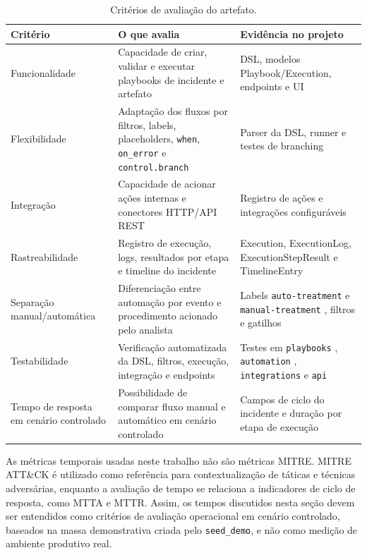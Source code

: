 \documentclass[article,a4paper,12pt,english,brazil,sumario=tradicional]{abntex2}
\newcommand{\codecell}[1]{%
  \begingroup
  \def\UrlLeft{}\def\UrlRight{}%
  \nolinkurl{#1}%
  \endgroup
}
\begin{document}
\begin{table}[!ht]
\centering
\footnotesize
\renewcommand{\arraystretch}{1.2}
\setlength{\extrarowheight}{1pt}
\setlength{\tabcolsep}{4pt}
\caption{Critérios de avaliação do artefato.}
\label{tab:criterios}
\begin{tabularx}{\textwidth}{@{}L{2.8cm} Y L{4.1cm}@{}}
\toprule
\textbf{Critério} & \textbf{O que avalia} & \textbf{Evidência no projeto} \\
\midrule
Funcionalidade & Capacidade de criar, validar e executar playbooks de incidente e artefato & DSL, modelos Playbook/Execution, endpoints e UI \\
Flexibilidade & Adaptação dos fluxos por filtros, labels, placeholders, \texttt{when}, \texttt{on\_error} e \texttt{control.branch} & Parser da DSL, runner e testes de branching \\
Integração & Capacidade de acionar ações internas e conectores HTTP/API REST & Registro de ações e integrações configuráveis \\
Rastreabilidade & Registro de execução, logs, resultados por etapa e timeline do incidente & Execution, ExecutionLog, ExecutionStepResult e TimelineEntry \\
Separação manual/automática & Diferenciação entre automação por evento e procedimento acionado pelo analista & Labels \codecell{auto-treatment} e \codecell{manual-treatment}, filtros e gatilhos \\
Testabilidade & Verificação automatizada da DSL, filtros, execução, integração e endpoints & Testes em \codecell{playbooks}, \codecell{automation}, \codecell{integrations} e \codecell{api} \\
Tempo de resposta em cenário controlado & Possibilidade de comparar fluxo manual e automático em cenário controlado & Campos de ciclo do incidente e duração por etapa de execução \\
\bottomrule
\end{tabularx}
\end{table}

As métricas temporais usadas neste trabalho não são métricas MITRE. MITRE ATT\&CK é utilizado como referência para contextualização de táticas e técnicas adversárias, enquanto a avaliação de tempo se relaciona a indicadores de ciclo de resposta, como MTTA e MTTR. Assim, os tempos discutidos nesta seção devem ser entendidos como critérios de avaliação operacional em cenário controlado, baseados na massa demonstrativa criada pelo \texttt{seed\_demo}, e não como medição de ambiente produtivo real.
\end{document}
